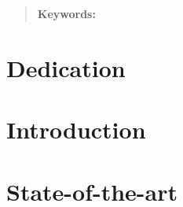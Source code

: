 \documentclass[12pt]{report} %
\begin{document}
\newpage %
\thispagestyle{empty}
\mbox{}

\renewcommand\abstractname{\large\uppercase{Summary}}
\begin{abstract}
\thispagestyle{plain}
\setcounter{page}{3}
	
	
	\textbf{Keywords:}
	
	\vfill
\end{abstract}
	\newpage %
	\thispagestyle{empty}
	\mbox{}


\chapter*{Dedication}

\setcounter{page}{5}
	
		
	\vfill
	
	\newpage %
	\thispagestyle{empty}
	\mbox{}
	

\tableofcontents
\thispagestyle{fancy}

\newpage %
\thispagestyle{empty}
\mbox{}

\listoffigures
\thispagestyle{fancy}

\newpage %
\thispagestyle{empty}
\mbox{}

\listoftables
\thispagestyle{fancy}

\newpage %
\thispagestyle{empty}
\mbox{}


\clearpage
{} %

\chapter{Introduction}


\chapter{State-of-the-art}

\end{document}
